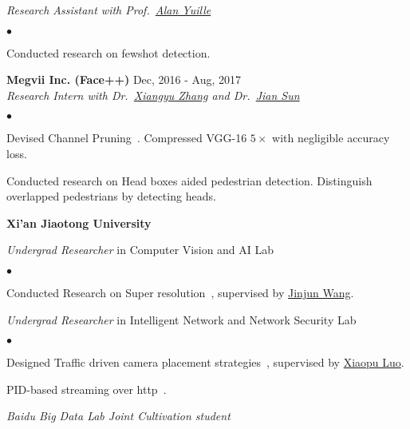 \documentclass[margin,line]{res}
\newenvironment{list2}{
  \begin{list}{$\bullet$}{%
      \setlength{\itemsep}{0in}
      \setlength{\parsep}{0in} \setlength{\parskip}{0in}
      \setlength{\topsep}{0in} \setlength{\partopsep}{0in} 
      \setlength{\leftmargin}{0.2in}}}{\end{list}}
\begin{document}
\begin{resume}
\vspace{-.3in}
{\em Research Assistant with Prof.~\href{http://www.cs.jhu.edu/~ayuille/}{Alan Yuille}}
\begin{list2}
\item Conducted research on fewshot detection.
\end{list2}

{\bf Megvii Inc. (Face++)} \hfill {Dec, 2016 - Aug, 2017}\\%

\vspace{-.3in}
{\em Research Intern with Dr.~\href{https://scholar.google.com/citations?user=yuB-cfoAAAAJ&hl=en&oi=ao}{Xiangyu Zhang} and Dr.~\href{http://www.jiansun.org/}{Jian Sun}} %
\begin{list2}
\item Devised Channel Pruning~\cite{He_2017_ICCV}. Compressed VGG-16 $5\times$ with negligible accuracy loss.
\item Conducted research on Head boxes aided pedestrian detection. Distinguish overlapped pedestrians by detecting heads.
\end{list2}

{\bf Xi'an Jiaotong University} %
\vspace{-.3cm}

{\em Undergrad Researcher} in Computer Vision and AI Lab %
\begin{list2}
\item Conducted Research on Super resolution~\cite{liang2017single}, supervised by \href{https://scholar.google.com/citations?user=Dk7JgNcAAAAJ&hl=en}{Jinjun Wang}.
\end{list2}

{\em Undergrad Researcher} in Intelligent Network and Network Security Lab%
\begin{list2}
\item Designed Traffic driven camera placement strategies~\cite{ma2017vehicle}, supervised by \href{http://www4.comp.polyu.edu.hk/~csxluo/}{Xiaopu Luo}.
\item PID-based streaming over http~\cite{pid}.
\end{list2}

{\em Baidu Big Data Lab Joint Cultivation student} %


\end{resume}
\end{document}
